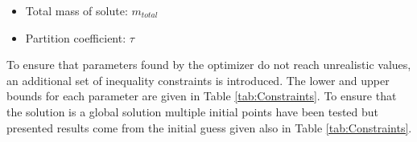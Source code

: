 \documentclass[../Article_Model_Parameters.tex]{subfiles}
\begin{document}
    \begin{itemize}
        \item Total mass of solute: \qquad\qquad\quad$m_{total}$
        \item Partition coefficient: \qquad\qquad\quad$\tau$
    \end{itemize}

	To ensure that parameters found by the optimizer do not reach unrealistic values, an additional set of inequality constraints is introduced. The lower and upper bounds for each parameter are given in Table \ref{tab:Constraints}. To ensure that the solution is a global solution multiple initial points have been tested but presented results come from the initial guess given also in Table \ref{tab:Constraints}.

	\begin{table}[!h]
		\centering
	\caption{Constraints and initial guess of the parameter estimation problem}
	\label{tab:Constraints}
	\end{table}

	
	
\end{document}
